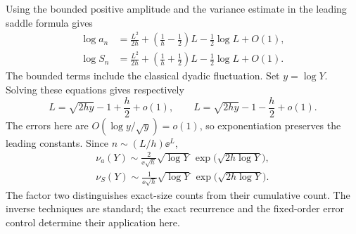 \documentclass[11pt,letterpaper]{article}
\theoremstyle{remark}\newtheorem{remark}[theorem]{Remark}
\begin{document}
Using the bounded positive amplitude and the variance estimate in the leading saddle formula gives
\begin{align}
 \log a_n&=\frac{L^2}{2h}+\left(\frac1h-\frac12\right)L
             -\frac12\log L+O(1),\label{urt:eq:loga}\\
 \log S_n&=\frac{L^2}{2h}+\left(\frac1h+\frac12\right)L
             -\frac12\log L+O(1).\label{urt:eq:logS}
\end{align}
The bounded terms include the classical dyadic fluctuation. Set $y=\log Y$. Solving these equations gives respectively
\[
 L=\sqrt{2hy}-1+\frac h2+o(1),\qquad
 L=\sqrt{2hy}-1-\frac h2+o(1).
\]
The errors here are $O(\log y/\sqrt y)=o(1)$, so exponentiation preserves the leading constants. Since $n\sim(L/h)\ee^L$,
\begin{equation}\label{urt:eq:inverseleading}
 \begin{aligned}
 \nu_a(Y)\sim\frac{2}{\ee\sqrt h}\sqrt{\log Y}\,
                   \exp\!\bigl(\sqrt{2h\log Y}\bigr),\\
 \nu_S(Y)\sim\frac{1}{\ee\sqrt h}\sqrt{\log Y}\,
                   \exp\!\bigl(\sqrt{2h\log Y}\bigr).
\end{aligned}
\end{equation}
The factor two distinguishes exact-size counts from their cumulative count. The inverse techniques are standard; the exact recurrence and the fixed-order error control determine their application here.
\end{document}
